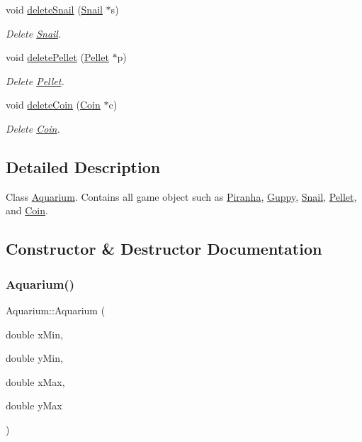 \begin{DoxyCompactItemize}
void \mbox{\hyperlink{class_aquarium_a08048866266aabb12b8cc82bac042c18}{delete\+Snail}} (\mbox{\hyperlink{class_snail}{Snail}} $\ast$s)
\begin{DoxyCompactList}\small\item\em Delete \mbox{\hyperlink{class_snail}{Snail}}. \end{DoxyCompactList}\item 
void \mbox{\hyperlink{class_aquarium_a61329fb56bcb5af2e06fc62568456f1b}{delete\+Pellet}} (\mbox{\hyperlink{class_pellet}{Pellet}} $\ast$p)
\begin{DoxyCompactList}\small\item\em Delete \mbox{\hyperlink{class_pellet}{Pellet}}. \end{DoxyCompactList}\item 
void \mbox{\hyperlink{class_aquarium_a187e59dd6efd62b577e97b8e00237c77}{delete\+Coin}} (\mbox{\hyperlink{class_coin}{Coin}} $\ast$c)
\begin{DoxyCompactList}\small\item\em Delete \mbox{\hyperlink{class_coin}{Coin}}. \end{DoxyCompactList}\end{DoxyCompactItemize}


\subsection{Detailed Description}
Class \mbox{\hyperlink{class_aquarium}{Aquarium}}. Contains all game object such as \mbox{\hyperlink{class_piranha}{Piranha}}, \mbox{\hyperlink{class_guppy}{Guppy}}, \mbox{\hyperlink{class_snail}{Snail}}, \mbox{\hyperlink{class_pellet}{Pellet}}, and \mbox{\hyperlink{class_coin}{Coin}}. 

\subsection{Constructor \& Destructor Documentation}
\mbox{\label{class_aquarium_abd216182838b8edad8626a580e6e99e1}} 
\subsubsection{\texorpdfstring{Aquarium()}{Aquarium()}}
{\footnotesize\ttfamily Aquarium\+::\+Aquarium (\begin{DoxyParamCaption}\item[{double}]{x\+Min,  }\item[{double}]{y\+Min,  }\item[{double}]{x\+Max,  }\item[{double}]{y\+Max }\end{DoxyParamCaption})}



